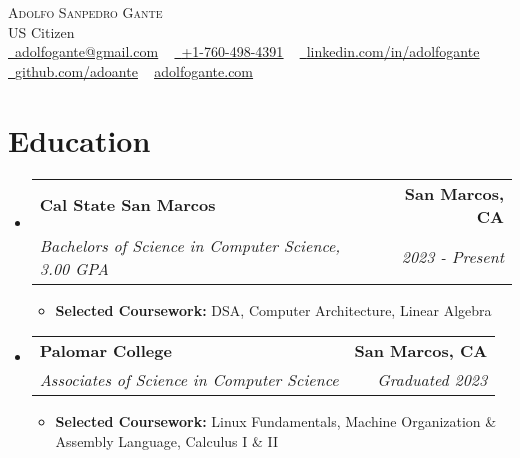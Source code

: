 \documentclass[letterpaper,11pt]{article}
\makeatletter
\newcommand{\resumeItem}[1]{
  \item\small{
    {#1 \vspace{-3pt}}
  }
}
\newcommand{\resumeSubheading}[4]{
  \vspace{-3pt}\item
    \begin{tabular*}{1.0\textwidth}[t]{l@{\extracolsep{\fill}}r}
      \textbf{#1} & \textbf{\small #2} \\
      \textit{\small#3} & \textit{\small #4} \\
    \end{tabular*}\vspace{-7pt}
}
\newcommand{\resumeSubHeadingListStart}{\begin{itemize}[leftmargin=0.0in, label={}]}
\newcommand{\resumeSubHeadingListEnd}{\end{itemize}}
\newcommand{\resumeItemListStart}{\begin{itemize}}
\newcommand{\resumeItemListEnd}{\end{itemize}\vspace{0pt}}
\makeatother
\begin{document}
    \begin{center}
        {\Huge\scshape Adolfo Sanpedro Gante} 
        \\ US Citizen\\
        \small
        \href{mailto:EMAIL}{\raisebox{-0.2\height}\faEnvelope\  \underline{adolfogante@gmail.com}} ~
        \href{tel:+17604984391}{\raisebox{-0.2\height}\faMobile\  \underline{+1-760-498-4391}} ~ 
        \href{LINK}{\raisebox{-0.2\height}\faLinkedin\ \underline{linkedin.com/in/adolfogante}}  ~
        \href{LINK}{\raisebox{-0.2\height}\faGithub\ \underline{github.com/adoante}} ~
        \href{LINK}{\underline{adolfogante.com}}
    \end{center}
    
\section{Education}
  \resumeSubHeadingListStart
  
    \resumeSubheading
    {Cal State San Marcos}{San Marcos, CA}
    {Bachelors of Science in Computer Science, 3.00 GPA}{2023 - Present}
        \resumeItemListStart
            \resumeItem{\textbf{Selected Coursework:} DSA, Computer Architecture, Linear Algebra}
        \resumeItemListEnd
    \resumeSubheading
    {Palomar College}{San Marcos, CA}
    {Associates of Science in Computer Science}{Graduated 2023}
        \resumeItemListStart
            \resumeItem{\textbf{Selected Coursework:} Linux Fundamentals, Machine Organization \& Assembly Language, Calculus I \& II}
        \resumeItemListEnd
        
  \resumeSubHeadingListEnd
  
\end{document}

